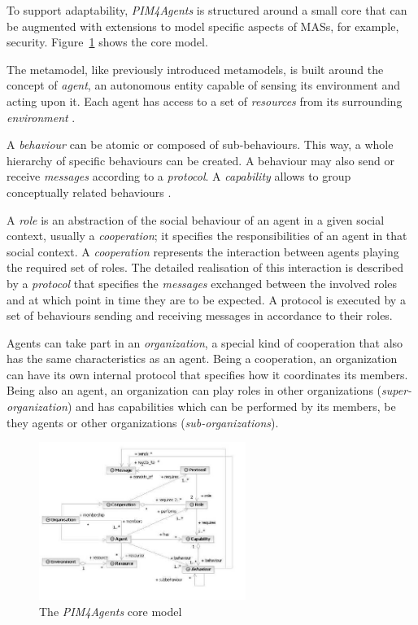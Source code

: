 To support adaptability, \textit{PIM4Agents} is structured around a small core that can be augmented with extensions to model specific aspects of MASs, for example, security.
Figure~\ref{figure:pim4agents-metamodel} shows the core model.

The metamodel, like previously introduced metamodels, is built around the concept of \textit{agent}, an autonomous entity capable of sensing its environment and acting upon it.
Each agent has access to a set of \textit{resources} from its surrounding \textit{environment} \cite{Hahn07b}.

A \textit{behaviour} can be atomic or composed of sub-behaviours.
This way, a whole hierarchy of specific behaviours can be created.
A behaviour may also send or receive \textit{messages} according to a \textit{protocol}.
A \textit{capability} allows to group conceptually related behaviours \cite{Hahn07b}.

A \textit{role} is an abstraction of the social behaviour of an agent in a given social context, usually a \textit{cooperation}; it specifies the responsibilities of an agent in that social context.
A \textit{cooperation} represents the interaction between agents playing the required set of roles.
The detailed realisation of this interaction is described by a \textit{protocol} that specifies the \textit{messages} exchanged between the involved roles and at which point in time they are to be expected.
A protocol is executed by a set of behaviours sending and receiving messages in accordance to their roles.

Agents can take part in an \textit{organization}, a special kind of cooperation that also has the same characteristics as an agent.
Being a cooperation, an organization can have its own internal protocol that specifies how it coordinates its members.
Being also an agent, an organization can play roles in other organizations (\textit{super-organization}) and has capabilities which can be performed by its members, be they agents or other organizations (\textit{sub-organizations}).

\begin{figure}[ht]
	\centering
	\includegraphics[width=0.6\textwidth]{images/pim4agents/pim4agents-metamodel.png}
	\caption{The \textit{PIM4Agents} core model \cite{Hahn07b}}
	\label{figure:pim4agents-metamodel}
\end{figure}


